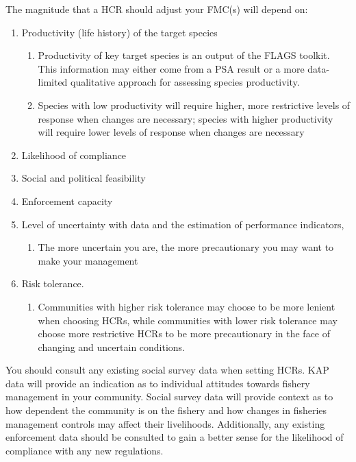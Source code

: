 \documentclass[]{book}
\providecommand{\tightlist}{%
  \setlength{\itemsep}{0pt}\setlength{\parskip}{0pt}}
\begin{document}
The magnitude that a HCR should adjust your FMC(s) will depend on:

\begin{enumerate}
\def\labelenumi{\arabic{enumi}.}
\item
  Productivity (life history) of the target species

  \begin{enumerate}
  \def\labelenumii{\alph{enumii}.}
  \item
    Productivity of key target species is an output of the FLAGS
    toolkit. This information may either come from a PSA result or a
    more data-limited qualitative approach for assessing species
    productivity.
  \item
    Species with low productivity will require higher, more restrictive
    levels of response when changes are necessary; species with higher
    productivity will require lower levels of response when changes are
    necessary
  \end{enumerate}
\item
  Likelihood of compliance
\item
  Social and political feasibility
\item
  Enforcement capacity
\item
  Level of uncertainty with data and the estimation of performance
  indicators,

  \begin{enumerate}
  \def\labelenumii{\alph{enumii}.}
  \tightlist
  \item
    The more uncertain you are, the more precautionary you may want to
    make your management
  \end{enumerate}
\item
  Risk tolerance.

  \begin{enumerate}
  \def\labelenumii{\alph{enumii}.}
  \tightlist
  \item
    Communities with higher risk tolerance may choose to be more lenient
    when choosing HCRs, while communities with lower risk tolerance may
    choose more restrictive HCRs to be more precautionary in the face of
    changing and uncertain conditions.
  \end{enumerate}
\end{enumerate}

You should consult any existing social survey data when setting HCRs.
KAP data will provide an indication as to individual attitudes towards
fishery management in your community. Social survey data will provide
context as to how dependent the community is on the fishery and how
changes in fisheries management controls may affect their livelihoods.
Additionally, any existing enforcement data should be consulted to gain
a better sense for the likelihood of compliance with any new
regulations.
\end{document}
